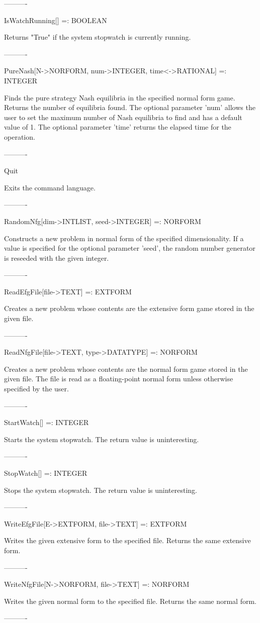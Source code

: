 ----------

IsWatchRunning[] =: BOOLEAN

	Returns "True" if the system stopwatch is currently running.

----------

PureNash[N->NORFORM, {num->INTEGER}, {time<->RATIONAL}] =: INTEGER

	Finds the pure strategy Nash equilibria in the specified normal form
game.  Returns the number of equilibria found.  The optional parameter 'num'
allows the user to set the maximum number of Nash equilibria to find and has
a default value of 1.  The optional parameter 'time' returns the elapsed 
time for the operation.

----------

Quit

	Exits the command language.

----------

RandomNfg[dim->INTLIST, {seed->INTEGER}] =: NORFORM

	Constructs a new problem in normal form of the specified
dimensionality.  If a value is specified for the optional parameter 'seed',
the random number generator is reseeded with the given integer.

----------

ReadEfgFile[file->TEXT] =: EXTFORM

	Creates a new problem whose contents are the extensive form game
stored in the given file.

----------

ReadNfgFile[file->TEXT, {type->DATATYPE}] =: NORFORM

	Creates a new problem whose contents are the normal form game stored
in the given file.  The file is read as a floating-point normal form unless
otherwise specified by the user.

----------

StartWatch[] =: INTEGER

	Starts the system stopwatch.  The return value is uninteresting.

----------

StopWatch[] =: INTEGER

	Stops the system stopwatch.  The return value is uninteresting.

----------

WriteEfgFile[E->EXTFORM, file->TEXT] =: EXTFORM

	Writes the given extensive form to the specified file.  Returns the
same extensive form.

----------

WriteNfgFile[N->NORFORM, file->TEXT] =: NORFORM

	Writes the given normal form to the specified file.  Returns the
same normal form.

----------





























